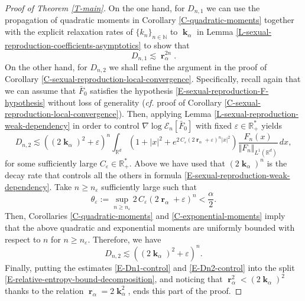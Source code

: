 \documentclass[reqno]{amsart}
\DeclareMathOperator{\bk}{\boldsymbol{k}}
\DeclareMathOperator{\br}{\boldsymbol{r}}
\numberwithin{equation}{section}
\begin{document}
{\begin{proof}[Proof of Theorem \ref{T-main}]
On the one hand, for $D_{n,1}$ we can use the propagation of quadratic moments in Corollary \ref{C-quadratic-moments} together with the explicit relaxation rates of $\{k_n\}_{n\in \mathbb{N}}$ to $\bk_\alpha$ in Lemma \ref{L-sexual-reproduction-coefficients-asymptotics} to show that 
\begin{equation}\label{E-Dn1-control}
D_{n,1}\lesssim \br_\alpha^{2n}.
\end{equation}
On the other hand, for $D_{n,2}$ we shall refine the argument in the proof of Corollary \ref{C-sexual-reproduction-local-convergence}. Specifically, recall again that we can assume that $\bar F_0$ satisfies the hypothesis \eqref{E-sexual-reproduction-F-hypothesis} without loss of generality ({\em cf.} proof of Corollary \ref{C-sexual-reproduction-local-convergence}). Then, applying Lemma \ref{L-sexual-reproduction-weak-dependency} in order to control $\nabla\log\mathcal{E}_n[\bar F_0]$ with fixed $\varepsilon\in \mathbb{R}_+^*$ yields
$$D_{n,2}\lesssim \left((2\bk_\alpha)^2+\varepsilon\right)^n\int_{\mathbb{R}^d}\left(1+|x|^2+e^{2\,C_\varepsilon(2\br_\alpha+\varepsilon)^n|x|^2}\right)\frac{F_n(x)}{\Vert F_n\Vert_{L^1(\mathbb{R}^d)}}\,dx,$$
for some sufficiently large $C_\varepsilon\in \mathbb{R}_+^*$. Above we have used that $(2\bk_\alpha)^n$ is the decay rate that controls all the others in formula \eqref{E-sexual-reproduction-weak-dependency}. Take $n\geq n_\varepsilon$ sufficiently large such that
$$\theta_\varepsilon:=\sup_{n\geq n_\varepsilon}2\,C_\varepsilon(2\br_\alpha+\varepsilon)^n<\frac{\alpha}{2}.$$
Then, Corollaries \ref{C-quadratic-moments} and \ref{C-exponential-moments} imply that the above quadratic and exponential moments are uniformly bounded with respect to $n$ for $n\geq n_\varepsilon$. Therefore, we have 
\begin{equation}\label{E-Dn2-control}
D_{n,2}\lesssim ((2\bk_\alpha)^2+\varepsilon)^n.
\end{equation}
Finally, putting the estimates \eqref{E-Dn1-control} and \eqref{E-Dn2-control} into the split \eqref{E-relative-entropy-bound-decomposition}, and noticing that $\br_\alpha^2<(2\bk_\alpha)^2$ thanks to the relation $\br_\alpha=2\bk_\alpha^2$, ends this part of the proof.

\medskip


\end{proof}}
\end{document}
